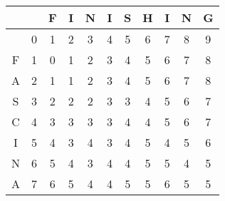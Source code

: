 \begin{table}
	\begin{center}
		\begin{tabular}[c]{c|c|c|c|c|c|c|c|c|c|c|}
			  &                      & F                     & I                     & N                     & I                     & S                     & H                     & I                    & N                    & G                    \\\hline
			  & \cellcolor{blue!25}0 & 1                     & 2                     & 3                     & 4                     & 5                     & 6                     & 7                    & 8                    & 9                    \\\hline
			F & 1                    & \cellcolor{blue!25}0  & \cellcolor{green!25}1 & \cellcolor{green!25}2 & \cellcolor{green!25}3 & \cellcolor{green!25}4 & \cellcolor{green!25}5 & 6                    & 7                    & 8                    \\\hline
			A & 2                    & \cellcolor{green!25}1 & \cellcolor{blue!25}1  & \cellcolor{green!25}2 & \cellcolor{green!25}3 & \cellcolor{green!25}4 & \cellcolor{green!25}5 & 6                    & 7                    & 8                    \\\hline
			S & 3                    & \cellcolor{green!25}2 & \cellcolor{green!25}2 & \cellcolor{blue!25}2  & \cellcolor{green!25}3 & \cellcolor{green!25}3 & \cellcolor{green!25}4 & 5                    & 6                    & 7                    \\\hline
			C & 4                    & \cellcolor{green!25}3 & \cellcolor{green!25}3 & \cellcolor{blue!25}3  & \cellcolor{green!25}3 & \cellcolor{green!25}4 & \cellcolor{green!25}4 & 5                    & 6                    & 7                    \\\hline
			I & 5                    & \cellcolor{green!25}4 & \cellcolor{green!25}3 & \cellcolor{green!25}4 & \cellcolor{blue!25}3  & \cellcolor{green!25}4 & \cellcolor{green!25}5 & 4                    & 5                    & 6                    \\\hline
			N & 6                    & \cellcolor{green!25}5 & \cellcolor{green!25}4 & \cellcolor{green!25}3 & \cellcolor{green!25}4 & \cellcolor{blue!25}4  & \cellcolor{green!25}5 & 5                    & 4                    & 5                    \\\hline
			A & 7                    & \cellcolor{green!25}6 & \cellcolor{green!25}5 & \cellcolor{green!25}4 & \cellcolor{green!25}4 & \cellcolor{green!25}5 & \cellcolor{blue!25}5  & 6                    & 5                    & 5                    \\\hline

\end{tabular}
\end{center}
\end{table}
